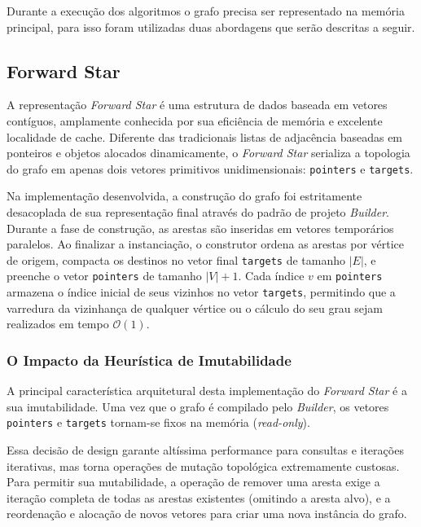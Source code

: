 \documentclass[12pt]{article}
\begin{document}
Durante a execução dos algoritmos o grafo precisa ser representado na memória principal, para isso foram utilizadas duas abordagens que serão descritas a seguir.

\subsection{Forward Star} \label{forward-star}

A representação \textit{Forward Star} é uma estrutura de dados baseada em vetores contíguos, amplamente conhecida por sua eficiência de memória e excelente localidade de cache. Diferente das tradicionais listas de adjacência baseadas em ponteiros e objetos alocados dinamicamente, o \textit{Forward Star} serializa a topologia do grafo em apenas dois vetores primitivos unidimensionais: \texttt{pointers} e \texttt{targets}.

Na implementação desenvolvida, a construção do grafo foi estritamente desacoplada de sua representação final através do padrão de projeto \textit{Builder}. Durante a fase de construção, as arestas são inseridas em vetores temporários paralelos. Ao finalizar a instanciação, o construtor ordena as arestas por vértice de origem, compacta os destinos no vetor final \texttt{targets} de tamanho $|E|$, e preenche o vetor \texttt{pointers} de tamanho $|V| + 1$. Cada índice $v$ em \texttt{pointers} armazena o índice inicial de seus vizinhos no vetor \texttt{targets}, permitindo que a varredura da vizinhança de qualquer vértice ou o cálculo do seu grau sejam realizados em tempo $\mathcal{O}(1)$.

\subsubsection{O Impacto da Heurística de Imutabilidade}

A principal característica arquitetural desta implementação do \textit{Forward Star} é a sua imutabilidade. Uma vez que o grafo é compilado pelo \textit{Builder}, os vetores \texttt{pointers} e \texttt{targets} tornam-se fixos na memória (\textit{read-only}). 

Essa decisão de design garante altíssima performance para consultas e iterações iterativas, mas torna operações de mutação topológica extremamente custosas. Para permitir sua mutabilidade, a operação de remover uma aresta exige a iteração completa de todas as arestas existentes (omitindo a aresta alvo), e a reordenação e alocação de novos vetores para criar uma nova instância do grafo.
\end{document}
